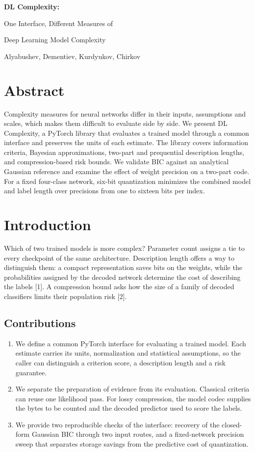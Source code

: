 \documentclass[10pt,a4paper]{article}
\begin{document}
\begin{center}
{\LARGE\bfseries DL Complexity:}\par
{\Large One Interface, Different Measures of\par Deep Learning Model Complexity}\par
\medskip Alyabushev, Dementiev, Kurdyukov, Chirkov\par

\end{center}
\section*{Abstract}
Complexity measures for neural networks differ in their inputs, assumptions and scales, which makes them difficult to evaluate side by side. We present DL Complexity, a PyTorch library that evaluates a trained model through a common interface and preserves the units of each estimate. The library covers information criteria, Bayesian approximations, two-part and prequential description lengths, and compression-based risk bounds. We validate BIC against an analytical Gaussian reference and examine the effect of weight precision on a two-part code. For a fixed four-class network, six-bit quantization minimizes the combined model and label length over precisions from one to sixteen bits per index.
\section{Introduction}
Which of two trained models is more complex? Parameter count assigns a tie to every checkpoint of the same architecture. Description length offers a way to distinguish them: a compact representation saves bits on the weights, while the probabilities assigned by the decoded network determine the cost of describing the labels [1]. A compression bound asks how the size of a family of decoded classifiers limits their population risk [2].

\subsection*{Contributions}
\begin{enumerate}
\setlength{\itemsep}{1pt}\setlength{\parsep}{0pt}
\item We define a common PyTorch interface for evaluating a trained model. Each estimate carries its units, normalization and statistical assumptions, so the caller can distinguish a criterion score, a description length and a risk guarantee.
\item We separate the preparation of evidence from its evaluation. Classical criteria can reuse one likelihood pass. For lossy compression, the model codec supplies the bytes to be counted and the decoded predictor used to score the labels.
\item We provide two reproducible checks of the interface: recovery of the closed-form Gaussian BIC through two input routes, and a fixed-network precision sweep that separates storage savings from the predictive cost of quantization.
\end{enumerate}
\end{document}
